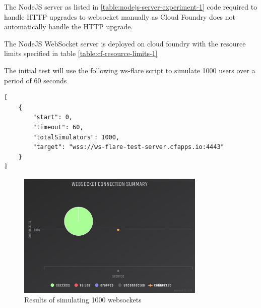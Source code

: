 The NodeJS server as listed in \ref{table:nodejs-server-experiment-1} code required to handle HTTP upgrades to websocket manually as Cloud Foundry does not automatically handle the HTTP upgrade.

The NodeJS WebSocket server is deployed on cloud foundry with the resource limits specified in table \ref{table:cf-resource-limits-1}

\begin{table}[H]
\caption{Cloud Foundry Resource Limits}
\label{table:cf-resource-limits-2}
\end{table}

The initial test will use the following ws-flare script to simulate 1000 users over a period of 60 seconds

\begin{listing}[H]
    \caption{WS-Flare test script for 1000 users}
    \label{table:nodejs-server-experiment-1}
    \begin{verbatim}
[
    {
        "start": 0,
        "timeout": 60,
        "totalSimulators": 1000,
        "target": "wss://ws-flare-test-server.cfapps.io:4443"
    }
]
\end{verbatim}
\end{listing}

\begin{figure}[H]
  \centering
    \includegraphics[width=0.8\textwidth]{figures/experiments/experiment-1/node-js/conn-summary-1000.png}
    \caption{Results of simulating 1000 websockets}
    \label{fig:experiment-1-conn-summary-1000}
\end{figure}

